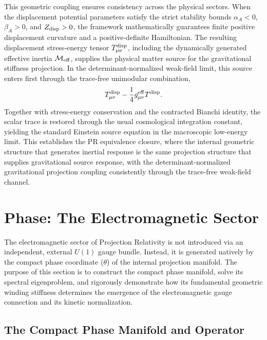 \documentclass[11pt]{article}
\begin{document}
This geometric coupling ensures consistency across the physical sectors. 
When the displacement potential parameters satisfy the strict stability bounds 
\(\alpha_A<0\), \(\beta_A>0\), and \(Z_{\rm disp}>0\), the framework 
mathematically guarantees finite positive displacement curvature and a 
positive-definite Hamiltonian.  The resulting displacement stress-energy tensor \(T^{\rm disp}_{\mu\nu}\), 
including the dynamically generated effective inertia \(\mathcal M_{\rm eff}\), 
supplies the physical matter source for the gravitational stiffness projection. 
In the determinant-normalized weak-field limit, this source enters first through 
the trace-free unimodular combination,
\begin{equation}
T^{\rm disp}_{\mu\nu}-\frac14 g^{\rm eff}_{\mu\nu}T^{\rm disp}.
\end{equation}
Together with stress-energy conservation and the contracted Bianchi identity, 
the scalar trace is restored through the usual cosmological integration constant, 
yielding the standard Einstein source equation in the macroscopic low-energy limit. This establishes the PR equivalence closure, where the internal geometric structure 
that generates inertial response is the same projection structure that supplies 
gravitational source response, with the determinant-normalized gravitational 
projection coupling consistently through the trace-free weak-field channel.

\section{Phase: The Electromagnetic Sector}
\label{sec:phase_electromagnetic_sector}

The electromagnetic sector of Projection Relativity is not introduced via an independent, external $U(1)$ gauge bundle. Instead, it is generated natively by the compact phase coordinate ($\theta$) of the internal projection manifold. The purpose of this section is to construct the compact phase manifold, solve its spectral eigenproblem, and rigorously demonstrate how its fundamental geometric winding stiffness determines the emergence of the electromagnetic gauge connection and its kinetic normalization.

\subsection{The Compact Phase Manifold and Operator}
\label{sec:compact_phase_manifold}
\end{document}
